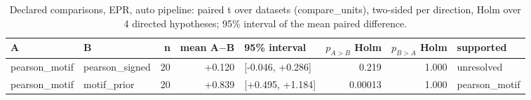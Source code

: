 \begin{table}[H]\centering\small
\caption{Declared comparisons, EPR, auto pipeline: paired t over datasets (compare\_units), two-sided per direction, Holm over 4 directed hypotheses; 95\% interval of the mean paired difference.}
\begin{tabular}{llrrlrrl}\toprule
A & B & n & mean A$-$B & 95\% interval & $p_{A>B}$ Holm & $p_{B>A}$ Holm & supported \\ \midrule
pearson\_motif & pearson\_signed & 20 & +0.120 & [-0.046, +0.286] & 0.219 & 1.000 & unresolved \\
pearson\_motif & motif\_prior & 20 & +0.839 & [+0.495, +1.184] & 0.00013 & 1.000 & pearson\_motif \\
\bottomrule\end{tabular}\end{table}
